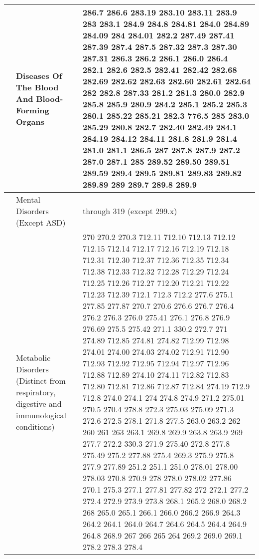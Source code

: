 \begin{longtable}{|R{.05in}|L{.65in}||L{5.65in}|}
   &  Diseases Of The Blood And Blood-Forming Organs &  286.7 286.6 283.19 283.10 283.11 283.9 283 283.1 284.9 284.8 284.81 284.0 284.89 284.09 284 284.01 282.2 287.49 287.41 287.39 287.4 287.5 287.32 287.3 287.30 287.31 286.3 286.2 286.1 286.0 286.4 282.1 282.6 282.5 282.41 282.42 282.68 282.69 282.62 282.63 282.60 282.61 282.64 282 282.8 287.33 281.2 281.3 280.0 282.9 285.8 285.9 280.9 284.2 285.1 285.2 285.3 280.1 285.22 285.21 282.3 776.5 285 283.0 285.29 280.8 282.7 282.40 282.49 284.1 284.19 284.12 284.11 281.8 281.9 281.4 281.0 281.1 286.5 287 287.8 287.9 287.2 287.0 287.1 285 289.52 289.50 289.51 289.59 289.4 289.5 289.81 289.83 289.82 289.89 289 289.7 289.8 289.9
  \\\hline
   & Mental Disorders (Except ASD) &  through 319 (except 299.x) \\\hline
   & Metabolic Disorders (Distinct from respiratory, digestive and immunological conditions) &  270 270.2 270.3 712.11 712.10 712.13 712.12 712.15 712.14 712.17 712.16 712.19 712.18 712.31 712.30 712.37 712.36 712.35 712.34 712.38 712.33 712.32 712.28 712.29 712.24 712.25 712.26 712.27 712.20 712.21 712.22 712.23 712.39 712.1 712.3 712.2 277.6 275.1 277.85 277.87 270.7 270.6 276.6 276.7 276.4 276.2 276.3 276.0 275.41 276.1 276.8 276.9 276.69 275.5 275.42 271.1 330.2 272.7 271 274.89 712.85 274.81 274.82 712.99 712.98 274.01 274.00 274.03 274.02 712.91 712.90 712.93 712.92 712.95 712.94 712.97 712.96 712.88 712.89 274.10 274.11 712.82 712.83 712.80 712.81 712.86 712.87 712.84 274.19 712.9 712.8 274.0 274.1 274 274.8 274.9 271.2 275.01 270.5 270.4 278.8 272.3 275.03 275.09 271.3 272.6 272.5 278.1 271.8 277.5 263.0 263.2 262 260 261 263 263.1 269.8 269.9 263.8 263.9 269 277.7 272.2 330.3 271.9 275.40 272.8 277.8 275.49 275.2 277.88 275.4 269.3 275.9 275.8 277.9 277.89 251.2 251.1 251.0 278.01 278.00 278.03 270.8 270.9 278 278.0 278.02 277.86 270.1 275.3 277.1 277.81 277.82 272 272.1 277.2 272.4 272.9 273.9 273.8 268.1 265.2 268.0 268.2 268 265.0 265.1 266.1 266.0 266.2 266.9 264.3 264.2 264.1 264.0 264.7 264.6 264.5 264.4 264.9 264.8 268.9 267 266 265 264 269.2 269.0 269.1 278.2 278.3 278.4\\\hline

\end{longtable}
